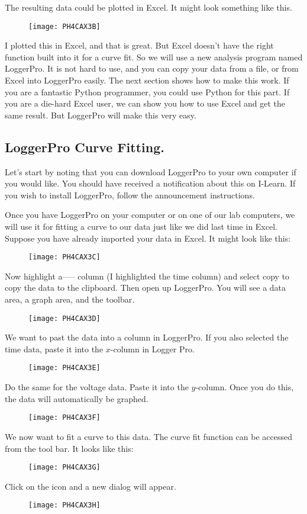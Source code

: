 The resulting data could be plotted in Excel. It might look something like
this.\begin{figure}[h!]
\texttt{[image: PH4CAX3B]}
\end{figure}I plotted this in Excel, and that
is great. But Excel doesn't have the right function built into it for a
curve fit. So we will use a new analysis program named LoggerPro. It is not
hard to use, and you can copy your data from a file, or from Excel into
LoggerPro easily. The next section shows how to make this work. If you are a
fantastic Python programmer, you could use Python for this part. If you are
a die-hard Excel user, we can show you how to use Excel and get the same
result. But LoggerPro will make this very easy.

\subsection{LoggerPro Curve Fitting.}

Let's start by noting that you can download LoggerPro to your own computer
if you would like. You should have received a notification about this on
I-Learn. If you wish to install LoggerPro, follow the announcement
instructions.

Once you have LoggerPro on your computer or on one of our lab computers, we
will use it for fitting a curve to our data just like we did last time in
Excel. Suppose you have already imported your data in Excel. It might look
like this:

\begin{figure}[h!]
\texttt{[image: PH4CAX3C]}
\end{figure}Now highlight a----- column (I
highlighted the time column) and select copy to copy the data to the
clipboard. Then open up LoggerPro. You will see a data area, a graph area,
and the toolbar.\begin{figure}[h!]
\texttt{[image: PH4CAX3D]}
\end{figure}We want to past the data into a
column in LoggerPro. If you also selected the time data, paste it into the $%
x $-column in Logger Pro. \begin{figure}[h!]
\texttt{[image: PH4CAX3E]}
\end{figure}

Do the same for the voltage data. Paste it into the $y$-column. Once you do
this, the data will automatically be graphed. \begin{figure}[h!]
\texttt{[image: PH4CAX3F]}
\end{figure}We now want to fit a curve to
this data. The curve fit function can be accessed from the tool bar. It
looks like this: \begin{figure}[h!]
\texttt{[image: PH4CAX3G]}
\end{figure}Click on the icon and a new
dialog will appear. \begin{figure}[h!]
\texttt{[image: PH4CAX3H]}
\end{figure}

